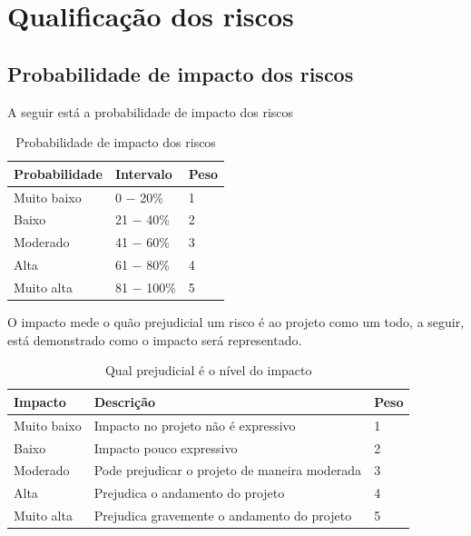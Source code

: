 \newpage

\section{Qualificação dos riscos}

\subsection{Probabilidade de impacto dos riscos}

  A seguir está a probabilidade de impacto dos riscos

  \begin{table}[!htb]
    \centering
    \begin{tabular}{p{5cm}p{3cm}p{3cm}}
      \toprule
        \textbf{Probabilidade} & \textbf{Intervalo} & \textbf{Peso} \\
      \midrule
        Muito baixo & 0 $-$ 20\%    & 1 \\ \midrule
        Baixo       & 21 $-$ 40\%   & 2 \\ \midrule
        Moderado    & 41 $-$ 60\%   & 3 \\ \midrule
        Alta        & 61 $-$ 80\%   & 4 \\ \midrule
        Muito alta  & 81 $-$ 100\%  & 5 \\
      \bottomrule
    \end{tabular}
    \caption{Probabilidade de impacto dos riscos}
  \end{table}

  O impacto mede o quão prejudicial um risco é ao projeto como um todo, a seguir, está demonstrado como o impacto será representado.

  \begin{table}[!htb]
    \centering
    \begin{tabular}{p{3cm}p{5cm}p{2cm}}
      \toprule
        \textbf{Impacto} & \textbf{Descrição} & \textbf{Peso} \\
      \midrule
        Muito baixo & Impacto no projeto não é expressivo           & 1 \\ \midrule
        Baixo       & Impacto pouco expressivo                      & 2 \\ \midrule
        Moderado    & Pode prejudicar o projeto de maneira moderada & 3 \\ \midrule
        Alta        & Prejudica o andamento do projeto              & 4 \\ \midrule
        Muito alta  & Prejudica gravemente o andamento do projeto   & 5 \\
      \bottomrule
    \end{tabular}
    \caption{Qual prejudicial é o nível do impacto}
  \end{table}

